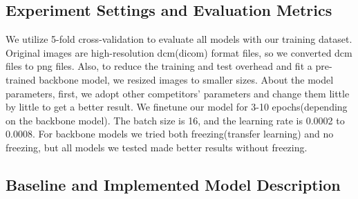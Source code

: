 \subsection{Experiment Settings and Evaluation Metrics} 
We utilize 5-fold cross-validation to evaluate all models with our training dataset. Original images are high-resolution dcm(dicom) format files, so we converted dcm files to png files. Also, to reduce the training and test overhead and fit a pre-trained backbone model, we resized images to smaller sizes. About the model parameters, first, we adopt other competitors’ parameters and change them little by little to get a better result. We finetune our model for 3-10 epochs(depending on the backbone model). The batch size is 16, and the learning rate is 0.0002 to 0.0008. For backbone models we tried both freezing(transfer learning) and no freezing, but all models we tested made better results without freezing.

\subsection{Baseline and Implemented Model Description}




